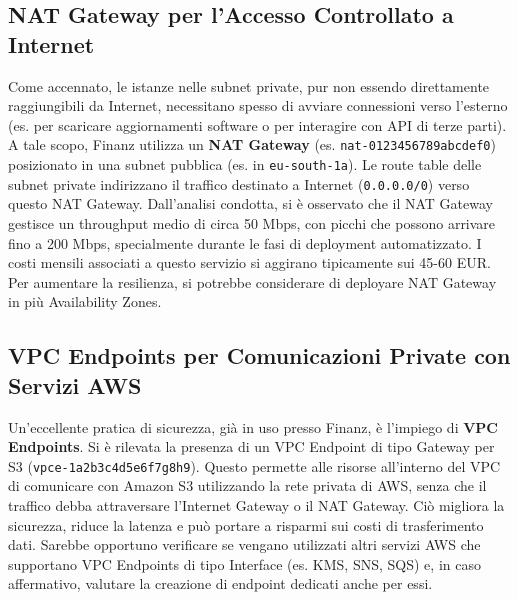 \subsection{NAT Gateway per l'Accesso Controllato a Internet}
\label{subsec:nat-gateway_cap2}
Come accennato, le istanze nelle subnet private, pur non essendo direttamente raggiungibili da Internet, necessitano spesso di avviare connessioni verso l'esterno (es. per scaricare aggiornamenti software o per interagire con API di terze parti). A tale scopo, Finanz utilizza un \textbf{NAT Gateway} (es. \texttt{nat-0123456789abcdef0}) posizionato in una subnet pubblica (es. in \texttt{eu-south-1a}). Le route table delle subnet private indirizzano il traffico destinato a Internet (\texttt{0.0.0.0/0}) verso questo NAT Gateway.
Dall'analisi condotta, si è osservato che il NAT Gateway gestisce un throughput medio di circa 50 Mbps, con picchi che possono arrivare fino a 200 Mbps, specialmente durante le fasi di deployment automatizzato. I costi mensili associati a questo servizio si aggirano tipicamente sui 45-60 EUR. Per aumentare la resilienza, si potrebbe considerare di deployare NAT Gateway in più Availability Zones.

\subsection{VPC Endpoints per Comunicazioni Private con Servizi AWS}
\label{subsec:vpc-endpoints_cap2}
Un'eccellente pratica di sicurezza, già in uso presso Finanz, è l'impiego di \textbf{VPC Endpoints}. Si è rilevata la presenza di un VPC Endpoint di tipo Gateway per S3 (\texttt{vpce-1a2b3c4d5e6f7g8h9}). Questo permette alle risorse all'interno del VPC di comunicare con Amazon S3 utilizzando la rete privata di AWS, senza che il traffico debba attraversare l'Internet Gateway o il NAT Gateway. Ciò migliora la sicurezza, riduce la latenza e può portare a risparmi sui costi di trasferimento dati.
Sarebbe opportuno verificare se vengano utilizzati altri servizi AWS che supportano VPC Endpoints di tipo Interface (es. KMS, SNS, SQS) e, in caso affermativo, valutare la creazione di endpoint dedicati anche per essi.

